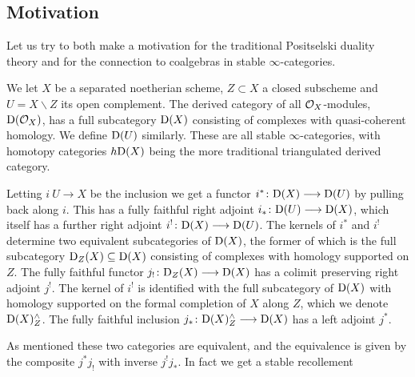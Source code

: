 \subsection*{Motivation}

Let us try to both make a motivation for the traditional Positselski duality theory and for the connection to coalgebras in stable $\infty$-categories. 

We let $X$ be a separated noetherian scheme, $Z\subset X$ a closed subscheme and $U = X\backslash Z$ its open complement. The derived category of all $\mathcal{O}_X$-modules, $\mathrm{D}(\mathcal{O}_X)$, has a full subcategory $\mathrm{D}(X)$ consisting of complexes with quasi-coherent homology. We define $\mathrm{D}(U)$ similarly. These are all stable $\infty$-categories, with homotopy categories $h\mathrm{D}(X)$ being the more traditional triangulated derived category.  

Letting $i\:U\to X$ be the inclusion we get a functor $i^*\colon \mathrm{D}(X)\longrightarrow \mathrm{D}(U)$ by pulling back along $i$. This has a fully faithful right adjoint $i_*\colon \mathrm{D}(U)\longrightarrow \mathrm{D}(X)$, which itself has a further right adjoint $i^!\colon \mathrm{D}(X)\longrightarrow \mathrm{D}(U)$. The kernels of $i^*$ and $i^!$ determine two equivalent subcategories of $\mathrm{D}(X)$, the former of which is the full subcategory $\mathrm{D}_Z(X)\subseteq \mathrm{D}(X)$ consisting of complexes with homology supported on $Z$. The fully faithful functor $j_!\colon \mathrm{D}_Z(X)\longrightarrow \mathrm{D}(X)$ has a colimit preserving right adjoint $j^!$. The kernel of $i^!$ is identified with the full subcategory of $\mathrm{D}(X)$ with homology supported on the formal completion of $X$ along $Z$, which we denote $\mathrm{D}(X)^\wedge_Z$. The fully faithful inclusion $j_*\colon\mathrm{D}(X)^\wedge_Z \longrightarrow \mathrm{D}(X)$ has a left adjoint $j^*$. 

As mentioned these two categories are equivalent, and the equivalence is given by the composite $j^* j_!$ with inverse $j^! j_*$. In fact we get a stable recollement
\begin{center}
\end{center}


